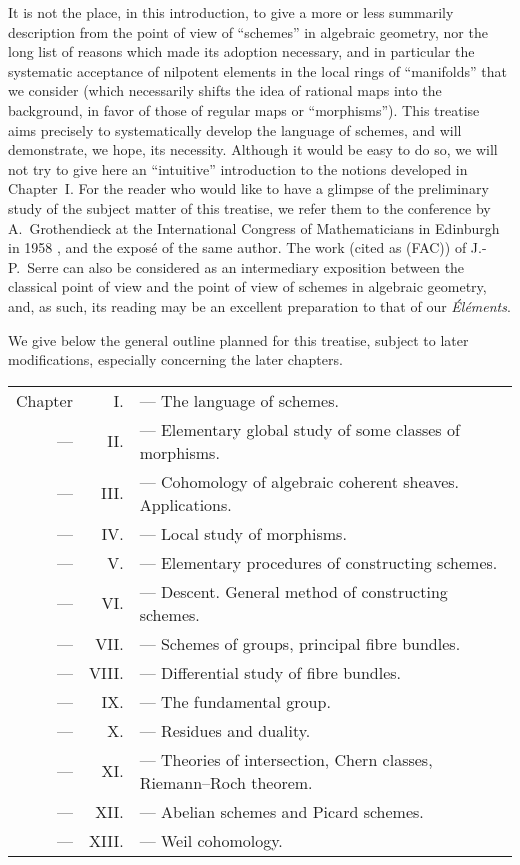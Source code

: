 It is not the place, in this introduction, to give a more or less summarily
description from the point of view of ``schemes'' in algebraic geometry, nor the
long list of reasons which made its adoption necessary, and in particular the
systematic acceptance of nilpotent elements in the local rings of ``manifolds''
that we consider (which necessarily shifts the idea of rational maps into
the background, in favor of those of regular maps or ``morphisms''). This
treatise aims precisely to systematically develop the language of schemes, and
will demonstrate, we hope, its necessity. Although it would be easy to do so,
we will not try to give here an ``intuitive'' introduction to the
notions developed in Chapter~I. For the reader who would like to have a glimpse
of the preliminary study of the subject matter of this treatise, we refer them
to the conference by A.~Grothendieck at the International Congress of
Mathematicians in Edinburgh in 1958 \cite{I-7}, and the expos\'e \cite{I-8} of the
same author. The work \cite{I-14} (cited as (FAC)) of J.-P.~Serre can also be
considered as an intermediary exposition between the classical point of view and
the point of view of schemes in algebraic geometry, and, as such, its reading
may be an excellent preparation to that of our {\em \'El\'ements}.

\sectionbreak

We give below the general outline planned for this treatise, subject to later
modifications, especially concerning the later chapters.

\begin{tabular}{rrl}
Chapter & I. & --- The language of schemes.\\
--- & II. & --- Elementary global study of some classes of morphisms.\\
--- & III. & --- Cohomology of algebraic coherent sheaves. Applications.\\
--- & IV. & --- Local study of morphisms.\\
--- & V. & --- Elementary procedures of constructing schemes.\\
--- & VI. & --- Descent. General method of constructing schemes.\\
--- & VII. & --- Schemes of groups, principal fibre bundles.\\
--- & VIII. & --- Differential study of fibre bundles.\\
--- & IX. & --- The fundamental group.\\
--- & X. & --- Residues and duality.\\
--- & XI. & --- Theories of intersection, Chern classes,
Riemann--Roch theorem.\\
--- & XII. & --- Abelian schemes and Picard schemes.\\
--- & XIII. & --- Weil cohomology.
\end{tabular}\\

